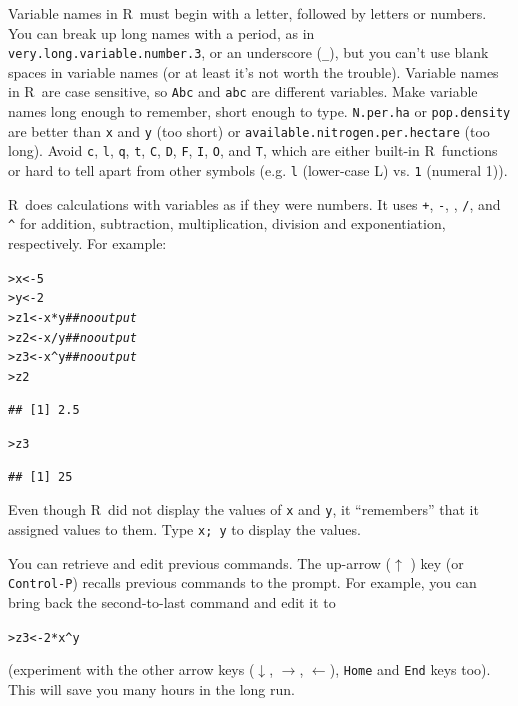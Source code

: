 \documentclass[11pt]{article}\usepackage[]{graphicx}\usepackage[]{color}
\makeatletter
\newcommand{\hlnum}[1]{\textcolor[rgb]{0.686,0.059,0.569}{#1}}%
\newcommand{\hlcom}[1]{\textcolor[rgb]{0.678,0.584,0.686}{\textit{#1}}}%
\newcommand{\hlopt}[1]{\textcolor[rgb]{0,0,0}{#1}}%
\newcommand{\hlstd}[1]{\textcolor[rgb]{0.345,0.345,0.345}{#1}}%
\newcommand{\hlkwb}[1]{\textcolor[rgb]{0.69,0.353,0.396}{#1}}%
\newenvironment{kframe}{%
 \def\at@end@of@kframe{}%
 \ifinner\ifhmode%
  \def\at@end@of@kframe{\end{minipage}}%
  \begin{minipage}{\columnwidth}%
 \fi\fi%
 \def\FrameCommand##1{\hskip\@totalleftmargin \hskip-\fboxsep
 \colorbox{shadecolor}{##1}\hskip-\fboxsep
     \hskip-\linewidth \hskip-\@totalleftmargin \hskip\columnwidth}%
 \MakeFramed {\advance\hsize-\width
   \@totalleftmargin\z@ \linewidth\hsize
   \@setminipage}}%
 {\par\unskip\endMakeFramed%
 \at@end@of@kframe}
\newenvironment{knitrout}{}{} %
\newcommand{\code}[1]{{\tt #1}}
\newcommand\R{{\sf R}}
\numberwithin{exercise}{section}
\makeatother
\begin{document}
Variable names in \R\ must begin with a letter, followed by letters or numbers.
You can break up long names with a period, as in
\code{very.long.variable.number.3}, or an underscore (\code{\_}), but you 
can't use blank spaces in variable names
(or at least it's not worth the trouble).
Variable names in \R\ are case sensitive,
so \code{Abc} and \code{abc} 
are different variables.
Make variable names long enough to remember, short
enough to type.
\code{N.per.ha} or \code{pop.density} are better than \code{x}
and \code{y} (too short) or \code{available.nitrogen.per.hectare} (too long).
Avoid \code{c}, \code{l}, \code{q}, \code{t}, \code{C}, \code{D},
\code{F}, \code{I}, \code{O}, and \code{T}, which are either built-in \R\ functions or
hard to tell apart from other symbols (e.g. \code{l} (lower-case L) vs. \code{1} (numeral 1)).

\R\ does calculations with variables as if they were numbers. It uses  
\code{+}, \code{-}, \code{*}, \code{/}, and \verb!^!
for addition, subtraction, multiplication, division and 
exponentiation, respectively. For example:
\begin{knitrout}
\color{fgcolor}\begin{kframe}
\begin{alltt}
\hlstd{> }\hlstd{x} \hlkwb{<-} \hlnum{5}
\hlstd{> }\hlstd{y} \hlkwb{<-} \hlnum{2}
\hlstd{> }\hlstd{z1} \hlkwb{<-} \hlstd{x}\hlopt{*}\hlstd{y}  \hlcom{## no output}
\hlstd{> }\hlstd{z2} \hlkwb{<-} \hlstd{x}\hlopt{/}\hlstd{y}  \hlcom{## no output}
\hlstd{> }\hlstd{z3} \hlkwb{<-} \hlstd{x}\hlopt{^}\hlstd{y}  \hlcom{## no output}
\hlstd{> }\hlstd{z2}
\end{alltt}
\begin{verbatim}
## [1] 2.5
\end{verbatim}
\begin{alltt}
\hlstd{> }\hlstd{z3}
\end{alltt}
\begin{verbatim}
## [1] 25
\end{verbatim}
\end{kframe}
\end{knitrout}
\noindent Even though \R\ did not display the values of \code{x} and \code{y}, it ``remembers'' that 
it assigned values to them. Type \code{x; y} to display the values. 

You can retrieve and edit previous commands.
The up-arrow (\thinspace $\uparrow$ \thinspace) key (or
\code{Control-P}) recalls previous 
commands to the prompt. For example, you can bring back the second-to-last command and edit it to
\begin{knitrout}
\color{fgcolor}\begin{kframe}
\begin{alltt}
\hlstd{> }\hlstd{z3} \hlkwb{<-} \hlnum{2}\hlopt{*}\hlstd{x}\hlopt{^}\hlstd{y}
\end{alltt}
\end{kframe}
\end{knitrout}
\noindent (experiment with the other arrow keys ($\downarrow$, $\rightarrow$, $\leftarrow$), \code{Home} and \code{End} keys
too).
This will save you many hours in the long run.
\end{document}
